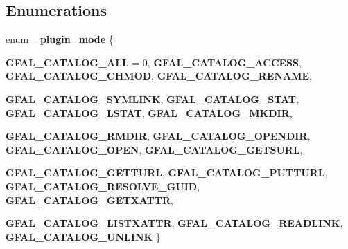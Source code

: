 \subsection*{Enumerations}
\begin{CompactItemize}
\item 
enum \textbf{\_\-plugin\_\-mode} \{ \par
\textbf{GFAL\_\-CATALOG\_\-ALL} = 0, 
\textbf{GFAL\_\-CATALOG\_\-ACCESS}, 
\textbf{GFAL\_\-CATALOG\_\-CHMOD}, 
\textbf{GFAL\_\-CATALOG\_\-RENAME}, 
\par
\textbf{GFAL\_\-CATALOG\_\-SYMLINK}, 
\textbf{GFAL\_\-CATALOG\_\-STAT}, 
\textbf{GFAL\_\-CATALOG\_\-LSTAT}, 
\textbf{GFAL\_\-CATALOG\_\-MKDIR}, 
\par
\textbf{GFAL\_\-CATALOG\_\-RMDIR}, 
\textbf{GFAL\_\-CATALOG\_\-OPENDIR}, 
\textbf{GFAL\_\-CATALOG\_\-OPEN}, 
\textbf{GFAL\_\-CATALOG\_\-GETSURL}, 
\par
\textbf{GFAL\_\-CATALOG\_\-GETTURL}, 
\textbf{GFAL\_\-CATALOG\_\-PUTTURL}, 
\textbf{GFAL\_\-CATALOG\_\-RESOLVE\_\-GUID}, 
\textbf{GFAL\_\-CATALOG\_\-GETXATTR}, 
\par
\textbf{GFAL\_\-CATALOG\_\-LISTXATTR}, 
\textbf{GFAL\_\-CATALOG\_\-READLINK}, 
\textbf{GFAL\_\-CATALOG\_\-UNLINK}
 \}
\end{CompactItemize}
